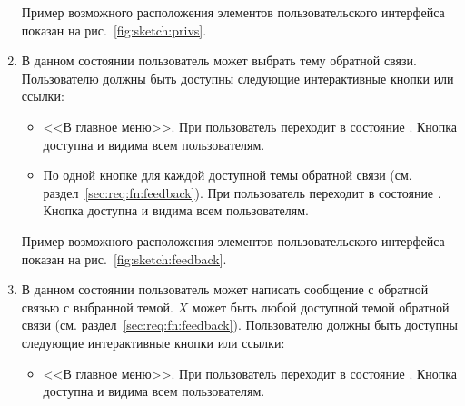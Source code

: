 \begin{enumerate}
                Пример возможного расположения элементов пользовательского интерфейса показан на
                рис.~\ref{fig:sketch:privs}.

            \item \label{itm:req:ui:states:feedback}

                В данном состоянии пользователь может выбрать тему обратной связи.
                Пользователю должны быть доступны следующие интерактивные кнопки или ссылки:
                \begin{itemize}
                    \item
                        <<В главное меню>>.
                        При  пользователь переходит в состояние
                        \hyperref[itm:req:ui:states:mainmenu]
                        {}.
                        Кнопка доступна и видима всем пользователям.
                    \item
                        По одной кнопке для каждой доступной темы обратной связи
                        (см. раздел~\ref{sec:req:fn:feedback}).
                        При  пользователь переходит в состояние
                        \hyperref[itm:req:ui:states:feedbackx]
                        {}.
                        Кнопка доступна и видима всем пользователям.
                \end{itemize}

                Пример возможного расположения элементов пользовательского интерфейса показан на
                рис.~\ref{fig:sketch:feedback}.

            \item \label{itm:req:ui:states:feedbackx}

                В данном состоянии пользователь может написать сообщение с обратной связью
                с выбранной темой. \(X\) может быть любой доступной темой обратной связи
                (см. раздел~\ref{sec:req:fn:feedback}).
                Пользователю должны быть доступны следующие интерактивные кнопки или ссылки:
                \begin{itemize}
                    \item
                        <<В главное меню>>.
                        При  пользователь переходит в состояние
                        \hyperref[itm:req:ui:states:mainmenu]
                        {}.
                        Кнопка доступна и видима всем пользователям.
                \end{itemize}


\end{enumerate}

